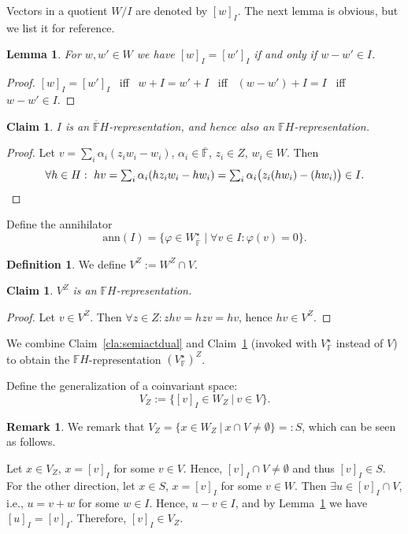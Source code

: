 \documentclass[a4paper]{extarticle}
\newcommand{\IF}{\mathbb{F}}
\newcommand{\oIF}{{\overline{\mathbb{F}}}}
\newcommand{\ann}{\mathrm{ann}}
\newcommand{\coinv}{V_Z}
\numberwithin{theorem}{section}
\newtheorem{lemma}[theorem]{Lemma}
\newtheorem{claim}[theorem]{Claim}
\theoremstyle{definition}
\newtheorem{definition/}[theorem]{Definition}
\newenvironment{definition}
  {\renewcommand{\qedsymbol}{\scalebox{0.65}{$\blacksquare$}}
   \pushQED{\qed}\begin{definition/}}
  {\popQED\end{definition/}}
\newtheorem{remark/}[theorem]{Remark}
\newenvironment{remark}
  {\renewcommand{\qedsymbol}{\scalebox{0.65}{$\blacksquare$}}
   \pushQED{\qed}\begin{remark/}}
  {\popQED\end{remark/}}
\begin{document}
Vectors in a quotient $W/I$ are denoted by $[w]_I$.
The next lemma is obvious, but we list it for reference.
\begin{lemma}
\label{lem:quotienteq}
For $w,w'\in W$ we have $[w]_I=[w']_I$ if and only if $w-w'\in I$.
\end{lemma}
\begin{proof}
$[w]_I=[w']_I$ \ iff \ $w+I = w'+I$ \ iff \ $(w-w')+I = I$ \ iff \ $w-w' \in I$.
\end{proof}


\begin{claim}\label{cla:IFH}
$I$ is an $\oIF H$-representation, and hence also an $\IF H$-representation.
\end{claim}
\begin{proof}
Let $v = \sum_i \alpha_i (z_i w_i - w_i)$, $\alpha_i\in\oIF$, $z_i\in Z$, $w_i\in W$.
Then
\[\textstyle
\forall h\in H : \ hv = \sum_i \alpha_i (h z_i w_i - h w_i) = \sum_i \alpha_i \big(z_i (h w_i) - (h w_i)\big) \in I. \qedhere
\]
\end{proof}
Define the annihilator
\[
\ann(I)=\{\varphi\in W^\star_\oIF\mid \forall v \in I: \varphi(v)=0\}.
\]


\begin{definition}\label{def:VinvZ}
We define $V^Z := W^Z \cap V$.
\end{definition}
\begin{claim}\label{cla:invH}
$V^Z$ is an $\IF H$-representation.
\end{claim}
\begin{proof}
Let $v \in V^Z$. Then $\forall z \in Z: zhv = hzv = hv$, hence $hv \in V^Z$.
\end{proof}


We combine Claim~\ref{cla:semiactdual} and Claim~\ref{cla:invH} (invoked with $V^\star_\IF$ instead of $V$) to obtain the $\IF H$-representation $(V^\star_\IF)^Z$.
 
 
Define the generalization of a coinvariant space:
\[
\coinv := \big\{[v]_I \in W_Z \ \big| \ v \in V\big\}.
\]
\begin{remark}
We remark that $\coinv = \big\{x \in W_Z \ \big| \ x\cap V \neq\emptyset \big\} =: S$, which can be seen as follows.
 
Let $x\in\coinv$, $x=[v]_I$ for some $v \in V$. Hence, $[v]_I\cap V \neq \emptyset$ and thus $[v]_I\in S$.
For the other direction, let 
$x\in S$, $x=[v]_I$ for some $v\in W$.
Then $\exists u \in [v]_I\cap V$, i.e., $u=v+w$ for some $w\in I$. Hence, $u-v\in I$, and by Lemma~\ref{lem:quotienteq} we have $[u]_I=[v]_I$.
Therefore, $[v]_I\in \coinv$.
\end{remark}
\end{document}
